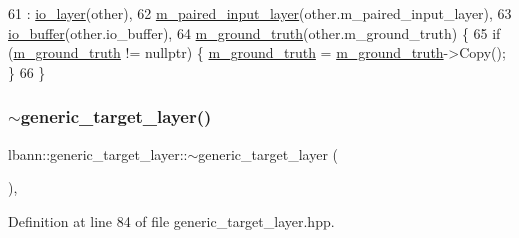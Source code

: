 \begin{DoxyCode}
61     : \hyperlink{classlbann_1_1io__layer_ab2b5002dfeb0806062ecf3d9fefb9948}{io\_layer}(other),
62       \hyperlink{classlbann_1_1generic__target__layer_a84da1260e9feb4fbc3e6f2315e4cab4b}{m\_paired\_input\_layer}(other.m\_paired\_input\_layer),
63       \hyperlink{classlbann_1_1generic__target__layer_a8da650b94f50cc63fc90cd792fa50c3f}{io\_buffer}(other.io\_buffer), 
64       \hyperlink{classlbann_1_1generic__target__layer_acb9ba351caf22b8e2378e4cd1e256da7}{m\_ground\_truth}(other.m\_ground\_truth) \{
65     \textcolor{keywordflow}{if} (\hyperlink{classlbann_1_1generic__target__layer_acb9ba351caf22b8e2378e4cd1e256da7}{m\_ground\_truth} != \textcolor{keyword}{nullptr}) \{ \hyperlink{classlbann_1_1generic__target__layer_acb9ba351caf22b8e2378e4cd1e256da7}{m\_ground\_truth} = 
      \hyperlink{classlbann_1_1generic__target__layer_acb9ba351caf22b8e2378e4cd1e256da7}{m\_ground\_truth}->Copy(); \}
66   \}
\end{DoxyCode}
\mbox{\label{classlbann_1_1generic__target__layer_a899373681fe6ede57383da34fe4156c1}} 
\subsubsection{\texorpdfstring{$\sim$generic\+\_\+target\+\_\+layer()}{~generic\_target\_layer()}}
{\footnotesize\ttfamily lbann\+::generic\+\_\+target\+\_\+layer\+::$\sim$generic\+\_\+target\+\_\+layer (\begin{DoxyParamCaption}{ }\end{DoxyParamCaption})\hspace{0.3cm}{\ttfamily [inline]}, {\ttfamily [override]}}



Definition at line 84 of file generic\+\_\+target\+\_\+layer.\+hpp.


